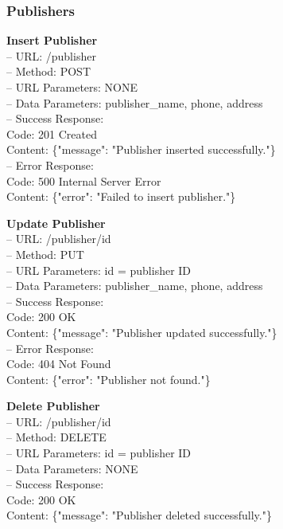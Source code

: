 \subsubsection*{Publishers}

\textbf{Insert Publisher} \\
– URL: /publisher \\
– Method: POST \\
– URL Parameters: NONE \\
– Data Parameters: publisher\_name, phone, address \\
– Success Response: \\
Code: 201 Created \\
Content: \{"message": "Publisher inserted successfully."\} \\
– Error Response: \\
Code: 500 Internal Server Error \\
Content: \{"error": "Failed to insert publisher."\}

\begin{flushleft} 
\textbf{Update Publisher} \\
– URL: /publisher/{id} \\
– Method: PUT \\
– URL Parameters: id = publisher ID \\
– Data Parameters: publisher\_name, phone, address \\
– Success Response: \\
Code: 200 OK \\
Content: \{"message": "Publisher updated successfully."\} \\
– Error Response: \\
Code: 404 Not Found \\
Content: \{"error": "Publisher not found."\}
\end{flushleft}

\begin{flushleft} 
\textbf{Delete Publisher} \\
– URL: /publisher/{id} \\
– Method: DELETE \\
– URL Parameters: id = publisher ID \\
– Data Parameters: NONE \\
– Success Response: \\
Code: 200 OK \\
Content: \{"message": "Publisher deleted successfully."\}
\end{flushleft}

